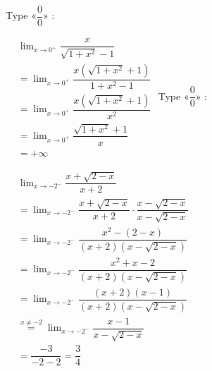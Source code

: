 {\begin{tasks}
\task Type «$ \dfrac{0}{0} $» :  

\(
\begin{aligned}
&\lim_{x \to 0^+} \dfrac{x}{\sqrt{1 + x^2} - 1}\\
&= \lim_{x \to 0^+} \dfrac{x(\sqrt{1 + x^2} + 1)}{1 + x^2 - 1} \\
&= \lim_{x \to 0^+} \dfrac{x(\sqrt{1 + x^2} + 1)}{x^2} \\
&= \lim_{x \to 0^+} \dfrac{\sqrt{1 + x^2} + 1}{x}\\
&=+\infty
\end{aligned}
\)
\task Type «$ \dfrac{0}{0} $» :  

\(
\begin{aligned}
&\lim_{x \to -2^-} \dfrac{x + \sqrt{2 - x}}{x + 2}\\
&= \lim_{x\to -2^-} \dfrac{x + \sqrt{2 - x}}{x + 2} \cdot \dfrac{x - \sqrt{2 - x}}{x - \sqrt{2 - x}} \\
&= \lim_{x\to-2^-} \dfrac{x^2 - (2 - x)}{(x + 2)(x - \sqrt{2 - x})} \\
&= \lim_{x\to-2^-}\dfrac{x^2 + x - 2}{(x + 2)(x - \sqrt{2 - x})} \\
&= \lim_{x\to-2^-}\dfrac{(x + 2)(x - 1)}{(x + 2)(x - \sqrt{2 - x})} \\
&\stackrel{x \ne -2}{=} \lim_{x\to-2^-} \dfrac{x - 1}{x - \sqrt{2 - x}} \\
&= \dfrac{-3}{-2 - 2} = \dfrac{3}{4}
\end{aligned}
\)
\end{tasks}

}

